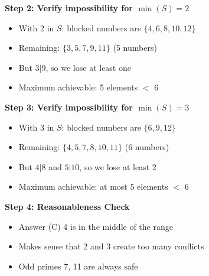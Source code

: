 \documentclass[12pt]{article}
\begin{document}
\begin{verificationbox}
\textbf{Step 2: Verify impossibility for $\min(S) = 2$}

\begin{itemize}
    \item With 2 in $S$: blocked numbers are $\{4,6,8,10,12\}$
    \item Remaining: $\{3,5,7,9,11\}$ (5 numbers)
    \item But $3|9$, so we lose at least one
    \item Maximum achievable: 5 elements $<$ 6 \checkmark
\end{itemize}

\textbf{Step 3: Verify impossibility for $\min(S) = 3$}

\begin{itemize}
    \item With 3 in $S$: blocked numbers are $\{6,9,12\}$
    \item Remaining: $\{4,5,7,8,10,11\}$ (6 numbers)
    \item But $4|8$ and $5|10$, so we lose at least 2
    \item Maximum achievable: at most 5 elements $<$ 6 \checkmark
\end{itemize}

\textbf{Step 4: Reasonableness Check}

\begin{itemize}
    \item Answer (C) 4 is in the middle of the range \checkmark
    \item Makes sense that 2 and 3 create too many conflicts \checkmark
    \item Odd primes 7, 11 are always safe \checkmark
\end{itemize}
\end{verificationbox}
\end{document}
